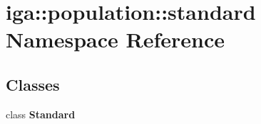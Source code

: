 \section{iga::population::standard Namespace Reference}
\label{namespaceiga_1_1population_1_1standard}


\subsection*{Classes}
\begin{CompactItemize}
\item 
class {\bf Standard}
\end{CompactItemize}
